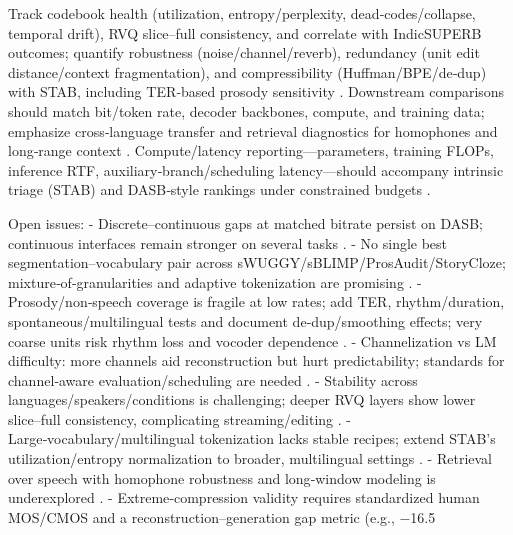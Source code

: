 Track codebook health (utilization, entropy/perplexity, dead‑codes/collapse, temporal drift), RVQ slice–full consistency, and correlate with IndicSUPERB outcomes; quantify robustness (noise/channel/reverb), redundancy (unit edit distance/context fragmentation), and compressibility (Huffman/BPE/de‑dup) with STAB, including TER‑based prosody sensitivity \cite{vashishth2024stabspeechtokenizerassessmentbenchmark,entry2025indicsuperbspeechprocessinguniversalperf,onda2025benchmarkingprosodyencodingdiscretespeec}. Downstream comparisons should match bit/token rate, decoder backbones, compute, and training data; emphasize cross‑language transfer and retrieval diagnostics for homophones and long‑range context \cite{har-tuv2025pastphoneticacousticspeechtokenizer,min2025speechretrievalaugmentedgenerationwithou,entry2025indicsuperbspeechprocessinguniversalperf}. Compute/latency reporting—parameters, training FLOPs, inference RTF, auxiliary‑branch/scheduling latency—should accompany intrinsic triage (STAB) and DASB‑style rankings under constrained budgets \cite{maimon2025scalinganalysisinterleavedspeechtextlang,mousavi2024dasbdiscreteaudiospeechbenchmark,vashishth2024stabspeechtokenizerassessmentbenchmark,maimon2025salmonsuiteacousticlanguagemodelevaluati,chen2023reducingbarriersselfsupervisedlearninghu}.

Open issues:
- Discrete–continuous gaps at matched bitrate persist on DASB; continuous interfaces remain stronger on several tasks \cite{mousavi2024dasbdiscreteaudiospeechbenchmark}.
- No single best segmentation–vocabulary pair across sWUGGY/sBLIMP/ProsAudit/StoryCloze; mixture‑of‑granularities and adaptive tokenization are promising \cite{kando2025exploringeffectsegmentationvocabularysiz}.
- Prosody/non‑speech coverage is fragile at low rates; add TER, rhythm/duration, spontaneous/multilingual tests and document de‑dup/smoothing effects; very coarse units risk rhythm loss and vocoder dependence \cite{onda2025benchmarkingprosodyencodingdiscretespeec,baade2024syllablelmlearningcoarsesemanticunitsspe}.
- Channelization vs LM difficulty: more channels aid reconstruction but hurt predictability; standards for channel‑aware evaluation/scheduling are needed \cite{ji2025languagecodecbridgingdiscreterepresentat}.
- Stability across languages/speakers/conditions is challenging; deeper RVQ layers show lower slice–full consistency, complicating streaming/editing \cite{vashishth2024stabspeechtokenizerassessmentbenchmark,maimon2025salmonsuiteacousticlanguagemodelevaluati,cui2025voxevalbenchmarkingknowledgeunderstandin,entry2025indicsuperbspeechprocessinguniversalperf}.
- Large‑vocabulary/multilingual tokenization lacks stable recipes; extend STAB’s utilization/entropy normalization to broader, multilingual settings \cite{vashishth2024stabspeechtokenizerassessmentbenchmark}.
- Retrieval over speech with homophone robustness and long‑window modeling is underexplored \cite{min2025speechretrievalaugmentedgenerationwithou,onda2025benchmarkingprosodyencodingdiscretespeec,maimon2025salmonsuiteacousticlanguagemodelevaluati,entry2025indicsuperbspeechprocessinguniversalperf}.
- Extreme‑compression validity requires standardized human MOS/CMOS and a reconstruction–generation gap metric (e.g., −16.5%

